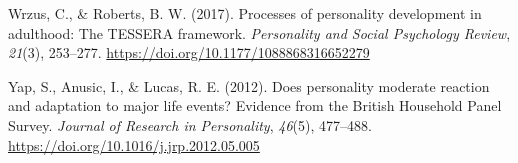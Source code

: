 \documentclass[
  english,
  man, noextraspace]{apa7}
\begin{document}
\leavevmode\hypertarget{ref-wrzusProcessesPersonalityDevelopment2017}{}%
Wrzus, C., \& Roberts, B. W. (2017). Processes of personality development in adulthood: The TESSERA framework. \emph{Personality and Social Psychology Review}, \emph{21}(3), 253--277. \url{https://doi.org/10.1177/1088868316652279}

\leavevmode\hypertarget{ref-yapDoesPersonalityModerate2012}{}%
Yap, S., Anusic, I., \& Lucas, R. E. (2012). Does personality moderate reaction and adaptation to major life events? Evidence from the British Household Panel Survey. \emph{Journal of Research in Personality}, \emph{46}(5), 477--488. \url{https://doi.org/10.1016/j.jrp.2012.05.005}

\endgroup


\clearpage
\makeatletter
\efloat@restorefloats
\makeatother
\end{document}

